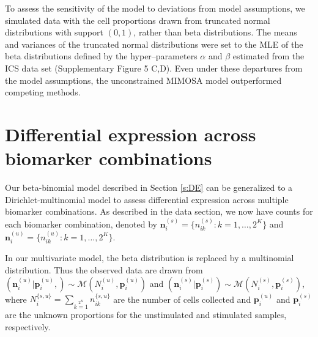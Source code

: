 \documentclass[12pt,oupdraft]{biostatistics}
\begin{document}
To assess the sensitivity of the model to deviations from model assumptions, we simulated data with the cell proportions drawn from  truncated normal distributions with support $(0,1)$, rather than beta distributions. The means and variances of the truncated normal distributions were set to the MLE of the beta distributions defined by the hyper--parameters  $\alpha$ and $\beta$ estimated from the ICS data set (Supplementary Figure 5 C,D). Even under these departures from the model assumptions, the unconstrained MIMOSA model outperformed competing methods.

\section{Differential expression across biomarker combinations}
\label{s:demarkercombos}
Our beta-binomial model described in Section \ref{s:DE} can be generalized to a Dirichlet-multinomial model to assess differential expression across multiple biomarker combinations. As described in the data section, we now have counts for each biomarker combination, denoted by  $\mathbf{n}^{(s)}_{i}=\{n^{(s)}_{ik}: k=1,\dots,2^K\}$ and $\mathbf{n}^{(u)}_{i}=\{n^{(u)}_{ik}: k=1,\dots,2^K\}$.

In our multivariate model, the beta distribution is replaced by a multinomial distribution. Thus the observed data are drawn from $(\mathbf{n}^{(u)}_{i}|\mathbf{p}^{(u)}_{i},) \sim \mathcal{M}(N^{(u)}_{i},\mathbf{p}^{(u)}_{i})$ and $(\mathbf{n}^{(s)}_{i}|\mathbf{p}^{(s)}_{i}) \sim \mathcal{M}(N^{(s)}_{i},\mathbf{p}^{(s)}_{i})$, where $N^{\{s,u\}}_{i}=\sum\limits_{k=1}\limits^{2^K} n^{\{s,u\}}_{ik}$ are the number of cells collected and $\mathbf{p}^{(u)}_{i}$ and $\mathbf{p}^{(s)}_{i}$ are the unknown proportions for the unstimulated and stimulated samples, respectively.


\end{document}
